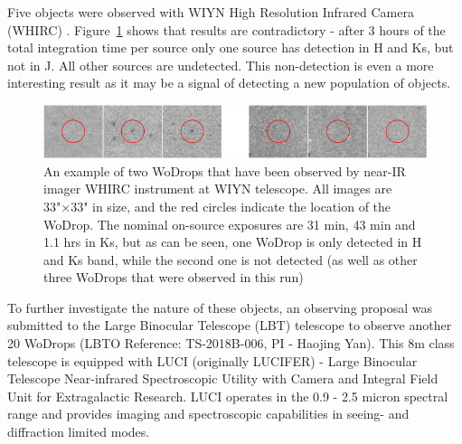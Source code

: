 Five objects were observed with WIYN High Resolution Infrared Camera (WHIRC) \citep{Smee2011a}. Figure~\ref{fig:wodrop_whirc} shows that results are contradictory - after 3 hours of the total integration time per source only one source has detection in H and Ks, but not in J. All other sources are undetected. This non-detection is even a more interesting result as it may be a signal of detecting a new population of objects. 

\begin{figure}[!ht]
\includegraphics[width=6in]{Figures/wodrop_whirc.png}
\caption{An example of two WoDrops that have been observed by near-IR imager WHIRC instrument at WIYN telescope. All images are 33"×33" in size, and the red circles indicate the location of the WoDrop. The nominal on-source exposures are 31 min, 43 min and 1.1 hrs in Ks, but as can be seen, one WoDrop is only detected in H and Ks band, while the second one is not detected (as well as other three WoDrops that were observed in this run)}
\label{fig:wodrop_whirc}
\end{figure}

To further investigate the nature of these objects, an observing proposal was submitted to the Large Binocular Telescope (LBT) telescope to observe another 20 WoDrops (LBTO Reference: TS-2018B-006, PI - Haojing Yan). This 8m class telescope is equipped with LUCI (originally LUCIFER) - Large Binocular Telescope Near-infrared Spectroscopic Utility with Camera and Integral Field Unit for Extragalactic Research. LUCI operates in the 0.9 - 2.5 micron spectral range and provides imaging and spectroscopic capabilities in seeing- and diffraction limited modes.